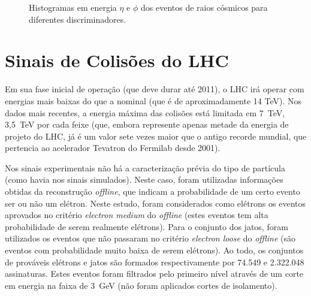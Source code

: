 \begin{figure}[h!]
\begin{minipage}[b]{0.98\linewidth}
  \centering
 \centerline{}
\end{minipage}
\hfill
\begin{minipage}[b]{0.98\linewidth}
  \centering
 \centerline{}
\end{minipage}
\hfill \linebreak
\begin{minipage}[b]{0.98\linewidth}
  \centering
 \centerline{}
\end{minipage}
\caption{Histogramas em energia $\eta$ e $\phi$ dos eventos de
raios cósmicos para diferentes discriminadores.}\label{figcosmicEF}
\end{figure}


\section{Sinais de Colisões do LHC}

Em sua fase inicial de operação (que deve durar até 2011), o LHC
irá operar com energias mais baixas do que a nominal (que é de
aproximadamente 14 TeV). Nos dados mais recentes, a energia máxima
das colisões está limitada em 7~TeV, 3,5~TeV por cada feixe (que,
embora represente apenas metade da energia de projeto do LHC, já é
um valor sete vezes maior que o antigo recorde mundial, que
pertencia ao acelerador Tevatron do Fermilab desde 2001).

Nos sinais experimentais não há a caracterização prévia do tipo de
partícula (como havia nos sinais simulados). Neste caso, foram
utilizadas informações obtidas da reconstrução \textit{offline},
que indicam a probabilidade de um certo evento ser ou não um
elétron. Neste estudo, foram considerados como elétrons os eventos
aprovados no critério \emph{electron medium} do \textit{offline}
(estes eventos tem alta probabilidade de serem realmente
elétrons). Para o conjunto dos jatos, foram utilizados os eventos
que não passaram no critério \emph{electron loose} do
\textit{offline} (são eventos com probabilidade muito baixa de
serem elétrons). Ao todo, os conjuntos de prováveis elétrons e
jatos são formados respectivamente por 74.549 e 2.322.048
assinaturas. Estes eventos foram filtrados pelo primeiro nível
através de um corte em energia na faixa de 3~GeV (não foram
aplicados cortes de isolamento).

